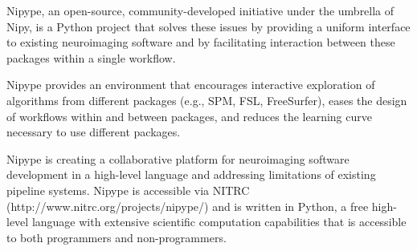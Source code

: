\documentclass[portrait,final]{baposter}
\begin{document}
\begin{poster}
{    Nipype, an open-source, community-developed initiative under the
    umbrella of Nipy, is a Python project that solves these issues by
    providing a uniform interface to existing neuroimaging software and
    by facilitating interaction between these packages within a single
    workflow. 

    Nipype provides an environment that encourages interactive
    exploration of algorithms from different packages (e.g., SPM, FSL,
    FreeSurfer), eases the design of workflows within and between
    packages, and reduces the learning curve necessary to use different
    packages. 

    Nipype is creating a collaborative platform for
    neuroimaging software development in a high-level language and
    addressing limitations of existing pipeline systems. Nipype is
    accessible via NITRC (http://www.nitrc.org/projects/nipype/) and is
    written in Python, a free high-level language with extensive
    scientific computation capabilities that is accessible to both
    programmers and non-programmers.

 \vspace{0.5em}
  }




\end{poster}
\end{document}
